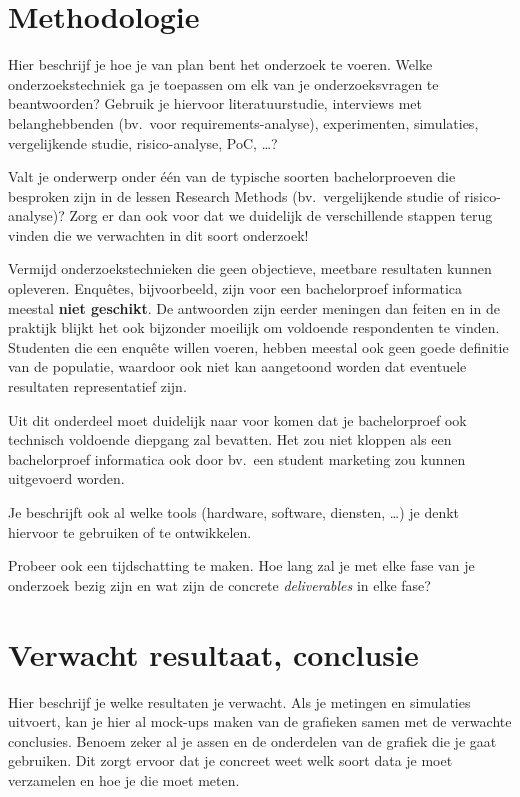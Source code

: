 \section{Methodologie}%
\label{sec:methodologie}

Hier beschrijf je hoe je van plan bent het onderzoek te voeren. Welke onderzoekstechniek ga je toepassen om elk van je onderzoeksvragen te beantwoorden? Gebruik je hiervoor literatuurstudie, interviews met belanghebbenden (bv.~voor requirements-analyse), experimenten, simulaties, vergelijkende studie, risico-analyse, PoC, \ldots?

Valt je onderwerp onder één van de typische soorten bachelorproeven die besproken zijn in de lessen Research Methods (bv.\ vergelijkende studie of risico-analyse)? Zorg er dan ook voor dat we duidelijk de verschillende stappen terug vinden die we verwachten in dit soort onderzoek!

Vermijd onderzoekstechnieken die geen objectieve, meetbare resultaten kunnen opleveren. Enquêtes, bijvoorbeeld, zijn voor een bachelorproef informatica meestal \textbf{niet geschikt}. De antwoorden zijn eerder meningen dan feiten en in de praktijk blijkt het ook bijzonder moeilijk om voldoende respondenten te vinden. Studenten die een enquête willen voeren, hebben meestal ook geen goede definitie van de populatie, waardoor ook niet kan aangetoond worden dat eventuele resultaten representatief zijn.

Uit dit onderdeel moet duidelijk naar voor komen dat je bachelorproef ook technisch voldoen\-de diepgang zal bevatten. Het zou niet kloppen als een bachelorproef informatica ook door bv.\ een student marketing zou kunnen uitgevoerd worden.

Je beschrijft ook al welke tools (hardware, software, diensten, \ldots) je denkt hiervoor te gebruiken of te ontwikkelen.

Probeer ook een tijdschatting te maken. Hoe lang zal je met elke fase van je onderzoek bezig zijn en wat zijn de concrete \emph{deliverables} in elke fase?

\section{Verwacht resultaat, conclusie}%
\label{sec:verwachte_resultaten}

Hier beschrijf je welke resultaten je verwacht. Als je metingen en simulaties uitvoert, kan je hier al mock-ups maken van de grafieken samen met de verwachte conclusies. Benoem zeker al je assen en de onderdelen van de grafiek die je gaat gebruiken. Dit zorgt ervoor dat je concreet weet welk soort data je moet verzamelen en hoe je die moet meten.

